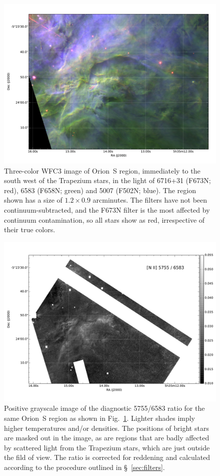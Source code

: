 \documentclass[preprint]{aastex}
\begin{document}
\begin{figure}
  \centering
  \includegraphics[width=\linewidth]{jet_region_rgb}
  \caption{Three-color WFC3 image of Orion~S region, immediately to
    the south west of the Trapezium stars, in the light of \sii{}
    6716+31 (F673N; red), \nii{} 6583 (F658N; green) and \oiii{} 5007
    (F502N; blue).  The region shown has a size of \(1.2 \times 0.9\)
    arcminutes.  The filters have not been continuum-subtracted, and
    the F673N filter is the most affected by continuum contamination,
    so all stars show as red, irrespective of their true colors.}
  \label{fig:rgb-jet}
\end{figure}

\begin{figure}
  \centering
  \includegraphics[width=\linewidth]{jet_region_niiratio}
  \caption{Positive grayscale image of the diagnostic \nii{} 5755/6583
    ratio for the same Orion~S region as shown in
    Fig.~\ref{fig:rgb-jet}.  Lighter shades imply higher temperatures
    and/or densities.  The positions of bright stars are masked out in
    the image, as are regions that are badly affected by scattered
    light from the Trapezium stars, which are just outside the fild of
    view.  The ratio is corrected for reddening and calculated
    according to the procedure outlined in \S~\ref{sec:filters}.}
  \label{fig:nii-jet}
\end{figure}
\end{document}
